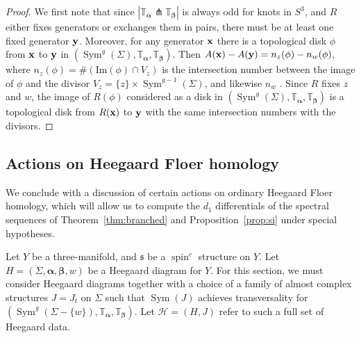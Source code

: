 \documentclass[11pt,reqno]{amsart}
\theoremstyle{definition}
\theoremstyle{remark}
\newcommand{\T}{\mathbb{T}}
\DeclareMathOperator{\spin}{{spin}}
\DeclareMathOperator{\Sym}{{Sym}}
\newcommand{\alphas}{\boldsymbol \alpha}
\newcommand{\betas}{\boldsymbol \beta}
\newcommand{\cH}{\mathcal{H}}
\numberwithin{equation}{section}
\begin{document}
\begin{proof} We first note that since $|\T_{\alphas} \pitchfork \T_{\betas}|$ is always odd for knots in $S^3$, and $R$ either fixes generators or exchanges them in pairs, there must be at least one fixed generator ${\bf y}$. Moreover, for any generator ${\bf x}$ there is a topological disk $\phi$ from ${\bf x}$ to ${\bf y}$ in $(\Sym^g(\Sigma), \T_{\alphas}, \T_{\betas})$. Then $A({\bf x}) - A({\bf y}) = n_{z}(\phi)-n_w(\phi)$, where $n_z(\phi) = \#(\mathrm{Im}(\phi) \cap V_z)$ is the intersection number between the image of $\phi$ and the divisor $V_z = \{z\} \times \Sym^{g-1}(\Sigma)$, and likewise $n_{w}$ \cite[Lemma 2.5]{OSKnots}. Since $R$ fixes $z$ and $w$, the image of $R(\phi)$ considered as a disk in $(\Sym^g(\Sigma), \T_{\alphas}, \T_{\betas})$ is a topological disk from $R({\bf x})$ to ${\bf y}$ with the same intersection numbers with the divisors. \end{proof}





\subsection{Actions on Heegaard Floer homology} \label{sec:actions}

We conclude with a discussion of certain actions on ordinary Heegaard Floer homology, which will allow us to compute the $d_1$ differentials of the spectral sequences of Theorem~\ref{thm:branched} and Proposition~\ref{prop:si} under special hypotheses.

Let $Y$ be a three-manifold, and $\mathfrak s$ be a $\spin^c$ structure on $Y$. Let $H = (\Sigma, \alphas, \betas, w)$ be a Heegaard diagram for $Y$. For this section, we must consider Heegaard diagrams together with a choice of a family of almost complex structures $J=J_t$ on $\Sigma$ such that $\Sym(J)$ achieves transversality for $(\Sym^g(\Sigma -\{w\}), \T_{\alphas}, \T_{\betas})$. Let $\cH=(H, J)$ refer to such a full set of Heegaard data.
\end{document}
